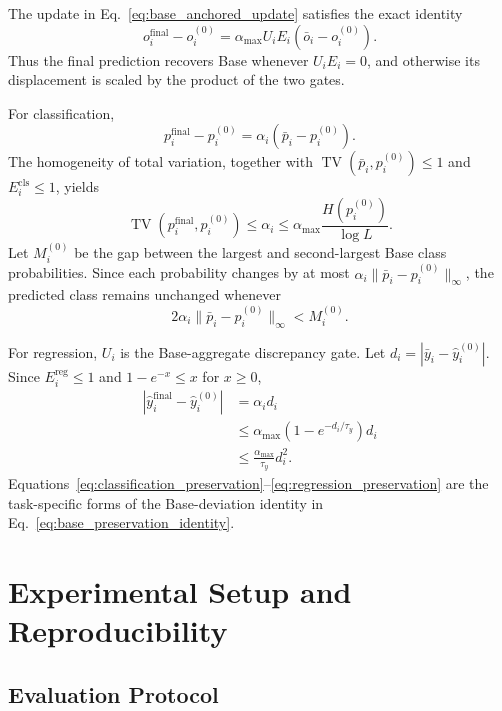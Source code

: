 The update in Eq.~\eqref{eq:base_anchored_update} satisfies the exact identity
\[
o_i^{\mathrm{final}}-o_i^{(0)}
=\alpha_{\max}U_iE_i(\bar o_i-o_i^{(0)}).
\]
Thus the final prediction recovers Base whenever $U_iE_i=0$, and otherwise
its displacement is scaled by the product of the two gates.

For classification,
\[
p_i^{\mathrm{final}}-p_i^{(0)}
=\alpha_i(\bar p_i-p_i^{(0)}).
\]
The homogeneity of total variation, together with
$\operatorname{TV}(\bar p_i,p_i^{(0)})\leq1$ and
$E_i^{\mathrm{cls}}\leq1$, yields
\begin{equation}
\operatorname{TV}(p_i^{\mathrm{final}},p_i^{(0)})
\leq\alpha_i
\leq\alpha_{\max}\frac{H(p_i^{(0)})}{\log L}.
\label{eq:classification_preservation}
\end{equation}
Let $M_i^{(0)}$ be the gap between the largest and second-largest Base class
probabilities.  Since each probability changes by at most
$\alpha_i\lVert\bar p_i-p_i^{(0)}\rVert_\infty$, the predicted class remains
unchanged whenever
\begin{equation}
2\alpha_i\lVert\bar p_i-p_i^{(0)}\rVert_\infty<M_i^{(0)}.
\label{eq:classification_margin_preservation}
\end{equation}

For regression, $U_i$ is the Base-aggregate discrepancy gate. Let
$d_i=|\bar y_i-\hat y_i^{(0)}|$. Since
$E_i^{\mathrm{reg}}\leq1$ and $1-e^{-x}\leq x$ for $x\geq0$,
\begin{equation}
\begin{aligned}
|\hat y_i^{\mathrm{final}}-\hat y_i^{(0)}|
&=\alpha_i d_i\\
&\leq\alpha_{\max}\left(1-e^{-d_i/\tau_y}\right)d_i\\
&\leq\frac{\alpha_{\max}}{\tau_y}d_i^2.
\end{aligned}
\label{eq:regression_preservation}
\end{equation}
Equations~\eqref{eq:classification_preservation}--\eqref{eq:regression_preservation}
are the task-specific forms of the Base-deviation identity in
Eq.~\eqref{eq:base_preservation_identity}.

\section{Experimental Setup and Reproducibility}
\label{app:experimental_setup}
\label{app:experimental_details}

\subsection{Evaluation Protocol}
\label{app:evaluation_protocol}

